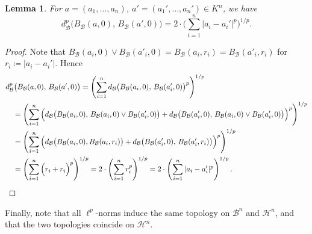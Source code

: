 \documentclass[10pt]{article}
\newtheorem{lemma}[theorem]{Lemma}
\theoremstyle{definition}
\begin{document}
\begin{lemma}
  \label{lem:metricExtendingFieldMetric}
  For $a=(a_1,\dots,a_n)$, $a'=(a_1',\dots,a_n')\in K^n$, we have
  \begin{equation*}
    d_{\mathcal{B}}^p\big(B_{\mathcal{B}}(a,0),\, B_{\mathcal{B}}(a',0)\big) = 2\cdot \Big(\sum_{i=1}^n |a_i-a_i'|^p\Big)^{1/p}.
  \end{equation*}
\end{lemma}
\begin{proof}
  Note that $B_{\mathcal{B}}(a_i,0)\vee B_{\mathcal{B}}(a'_i,0)=B_{\mathcal{B}}(a_i,r_i)=B_{\mathcal{B}}(a'_i,r_i)$ for $r_i\coloneqq |a_i-a_i'|$.  Hence
  \begin{align*}
    &d_{\mathcal{B}}^p\big(B_{\mathcal{B}}(a,0),\, B_{\mathcal{B}}(a',0)\big) = \left(\sum_{i=1}^n d_{\mathcal{B}}\big(B_{\mathcal{B}}(a_i,0),\, B_{\mathcal{B}}(a_i',0)\big)^p\right)^{1/p}\\
    &\quad = \left(\sum_{i=1}^n \Big(d_{\mathcal{B}}\big(B_{\mathcal{B}}(a_i,0),\, B_{\mathcal{B}}(a_i,0)\vee B_{\mathcal{B}}(a_i',0)\big)+d_{\mathcal{B}}\big(B_{\mathcal{B}}(a_i',0),\, B_{\mathcal{B}}(a_i,0)\vee B_{\mathcal{B}}(a_i',0)\big) \Big)^p\right)^{1/p}\\
    &\quad = \left(\sum_{i=1}^n \Big(d_{\mathcal{B}}\big(B_{\mathcal{B}}(a_i,0),B_{\mathcal{B}}(a_i,r_i)\big)+d_{\mathcal{B}}\big(B_{\mathcal{B}}(a_i',0),\, B_{\mathcal{B}}(a_i',r_i)\big) \Big)^p\right)^{1/p}\\
    &\quad = \left(\sum_{i=1}^n \Big(r_i+r_i\Big)^p\right)^{1/p} = 2\cdot \left(\sum_{i=1}^n r_i^p\right)^{1/p} = 2\cdot \left(\sum_{i=1}^n |a_i-a_i'|^p\right)^{1/p}. \qedhere
  \end{align*}
\end{proof}

Finally, note that all $\ell^p$-norms induce the same topology on $\mathcal B^n$ and $\mathcal H^n$, and that the two topologies coincide on $\mathcal H^n$.
\end{document}
